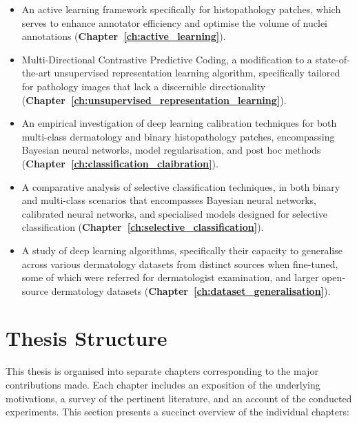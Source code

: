 \begin{itemize}
	
	\item An active learning framework specifically for histopathology patches, which serves to enhance annotator efficiency and optimise the volume of nuclei annotations (\textbf{Chapter~\ref{ch:active_learning}}).
	
	\item Multi-Directional Contrastive Predictive Coding, a modification to a state-of-the-art unsupervised representation learning algorithm, specifically tailored for pathology images that lack a discernible directionality (\textbf{Chapter~\ref{ch:unsupervised_representation_learning}}).
	
	\item An empirical investigation of deep learning calibration techniques for both multi-class dermatology and binary histopathology patches, encompassing Bayesian neural networks, model regularisation, and post hoc methods (\textbf{Chapter~\ref{ch:classification_claibration}}).
	
	\item A comparative analysis of selective classification techniques, in both binary and multi-class scenarios that encompasses Bayesian neural networks, calibrated neural networks, and specialised models designed for selective classification (\textbf{Chapter~\ref{ch:selective_classification}}).
	
	\item A study of deep learning algorithms, specifically their capacity to generalise across various dermatology datasets from distinct sources when fine-tuned, some of which were referred for dermatologist examination, and larger open-source dermatology datasets (\textbf{Chapter~\ref{ch:dataset_generalisation}}).
	
\end{itemize}



\section{Thesis Structure}
\label{sec:thesis_structure}
This thesis is organised into separate chapters corresponding to the major contributions made. Each chapter includes an exposition of the underlying motivations, a survey of the pertinent literature, and an account of the conducted experiments. This section presents a succinct overview of the individual chapters:

